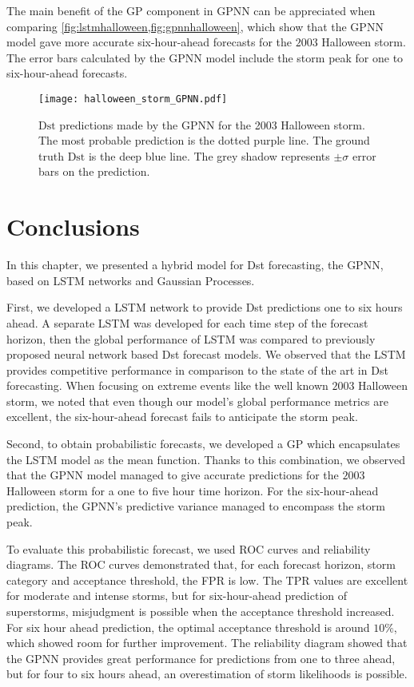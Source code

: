 The main benefit of the GP component in GPNN can be appreciated when comparing 
\cref{fig:lstmhalloween,fig:gpnnhalloween}, which show that the GPNN model gave more accurate 
six-hour-ahead forecasts for the $2003$ Halloween storm. The error bars calculated by the GPNN 
model include the storm peak for one to six-hour-ahead forecasts.

\begin{figure}
	\texttt{[image: halloween\_storm\_GPNN.pdf]}
	\caption{$\mathrm{Dst}$ predictions made by the GPNN for the 2003 Halloween storm. 
	The most probable prediction is the dotted purple line. 
	The ground truth $\mathrm{Dst}$ is the deep blue line. 
	The grey shadow represents $\pm\sigma$ error bars on the prediction.}
    \label{fig:gpnnhalloween}
\end{figure}



\section{Conclusions}


In this chapter, we presented a hybrid model for Dst forecasting, the GPNN, based on LSTM 
networks and Gaussian Processes. 

First, we developed a LSTM network to provide Dst predictions one to six hours ahead. A separate 
LSTM was developed for each time step of the forecast horizon, then the global performance of LSTM 
was compared to previously proposed neural network based Dst forecast models. We observed that the 
LSTM provides competitive performance in comparison to the state of the art in Dst forecasting. 
When focusing on extreme events like the well known $2003$ Halloween storm, we noted that even 
though our model's global performance metrics are excellent, the six-hour-ahead forecast fails to 
anticipate the storm peak. 

Second, to obtain probabilistic forecasts, we developed a GP which encapsulates the LSTM model as 
the mean function. Thanks to this combination, we observed that the GPNN model managed to give 
accurate predictions for the $2003$ Halloween storm for a one to five hour time horizon. For the 
six-hour-ahead prediction, the GPNN's predictive variance managed to encompass the storm peak. 

To evaluate this probabilistic forecast, we used ROC curves and reliability diagrams. The ROC 
curves demonstrated that, for each forecast horizon, storm category and acceptance threshold, 
the FPR is low. The TPR values are excellent for moderate and intense storms, but for 
six-hour-ahead prediction of superstorms, misjudgment is possible when the acceptance threshold 
increased. For six hour ahead prediction, the optimal acceptance threshold is around $10\%$, 
which showed room for further improvement. The reliability diagram showed that the GPNN provides 
great performance for predictions from one to three ahead, but for four to six hours ahead, an 
overestimation of storm likelihoods is possible.


